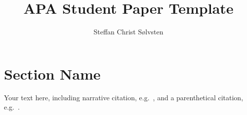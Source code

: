 \documentclass[
    a4paper, %
    stu,     %
]{apa7}
\title{APA Student Paper Template}
\author{Steffan Christ S{\o}lvsten}
\affiliation{Department of Computer Science, Aarhus University}
\begin{document}
\maketitle
\section{Section Name}
Your text here, including narrative citation, e.g.\ \textcite{soelvsten2022:TACAS},
and a parenthetical citation, e.g.\ \parencite{soelvsten2022:TACAS}.

\printbibliography
\end{document}
